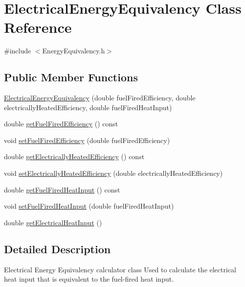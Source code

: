 \hypertarget{class_electrical_energy_equivalency}{}\section{Electrical\+Energy\+Equivalency Class Reference}
\label{class_electrical_energy_equivalency}


{\ttfamily \#include $<$Energy\+Equivalency.\+h$>$}

\subsection*{Public Member Functions}
\begin{DoxyCompactItemize}
\item 
\hyperlink{class_electrical_energy_equivalency_aeec1363ce72c89b00aade01a93200e06}{Electrical\+Energy\+Equivalency} (double fuel\+Fired\+Efficiency, double electrically\+Heated\+Efficiency, double fuel\+Fired\+Heat\+Input)
\item 
double \hyperlink{class_electrical_energy_equivalency_adc8def25354f6ba8c3479040507b0ea6}{get\+Fuel\+Fired\+Efficiency} () const
\item 
void \hyperlink{class_electrical_energy_equivalency_ac73a4dadfeeff737a24b58e805ce9a3a}{set\+Fuel\+Fired\+Efficiency} (double fuel\+Fired\+Efficiency)
\item 
double \hyperlink{class_electrical_energy_equivalency_a83438510f522aa045f4b1007fca1d2fd}{get\+Electrically\+Heated\+Efficiency} () const
\item 
void \hyperlink{class_electrical_energy_equivalency_ab9091e720096a4c088cece14e975ccb4}{set\+Electrically\+Heated\+Efficiency} (double electrically\+Heated\+Efficiency)
\item 
double \hyperlink{class_electrical_energy_equivalency_acb07f4cd7d416922bc355b2f1b3aadb4}{get\+Fuel\+Fired\+Heat\+Input} () const
\item 
void \hyperlink{class_electrical_energy_equivalency_a9daf2b93c52c31cb999e5a9a18f1dd54}{set\+Fuel\+Fired\+Heat\+Input} (double fuel\+Fired\+Heat\+Input)
\item 
double \hyperlink{class_electrical_energy_equivalency_aac8365a7d5b4e111ddbe7fc0c9beecc7}{get\+Electrical\+Heat\+Input} ()
\end{DoxyCompactItemize}


\subsection{Detailed Description}
Electrical Energy Equivalency calculator class Used to calculate the electrical heat input that is equivalent to the fuel-\/fired heat input. 

